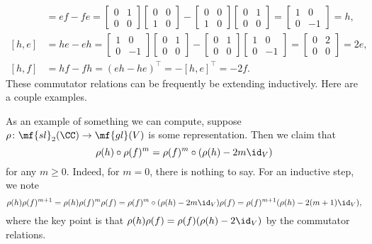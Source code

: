 \documentclass[../notes.tex]{subfiles}
\begin{document}
\begin{align*}
	[e,f] &= ef-fe = \begin{bmatrix}
		0 & 1 \\
		0 & 0
	\end{bmatrix}\begin{bmatrix}
		0 & 0 \\
		1 & 0
	\end{bmatrix}-\begin{bmatrix}
		0 & 0 \\
		1 & 0
	\end{bmatrix}\begin{bmatrix}
		0 & 1 \\
		0 & 0
	\end{bmatrix}=\begin{bmatrix}
		1 & 0 \\ 0 & -1
	\end{bmatrix}=h, \\
	[h,e] &= he-eh = \begin{bmatrix}
		1 & 0 \\
		0 & -1
	\end{bmatrix}\begin{bmatrix}
		0 & 1 \\
		0 & 0
	\end{bmatrix}-\begin{bmatrix}
		0 & 1 \\
		0 & 0
	\end{bmatrix}\begin{bmatrix}
		1 & 0 \\
		0 & -1
	\end{bmatrix} = \begin{bmatrix}
		0 & 2 \\
		0 & 0
	\end{bmatrix} = 2e, \\
	[h,f] &= hf-fh = (eh-he)^\intercal = -[h,e]^\intercal = -2f.
\end{align*}
These commutator relations can be frequently be extending inductively. Here are a couple examples.
\begin{example} \label{ex:sl2-hf-power}
	As an example of something we can compute, suppose $\rho\colon\mf{sl}_2(\CC)\to\mf{gl}(V)$ is some representation. Then we claim that
	\[\rho(h)\circ\rho(f)^m=\rho(f)^m\circ(\rho(h)-2m{\id_V})\]
	for any $m\ge0$. Indeed, for $m=0$, there is nothing to say. For an inductive step, we note
	\[\rho(h)\rho(f)^{m+1}=\rho(h)\rho(f)^m\rho(f)=\rho(f)^m\circ(\rho(h)-2m{\id_V})\rho(f)=\rho(f)^{m+1}(\rho(h)-2(m+1){\id_V}),\]
	where the key point is that $\rho(h)\rho(f)=\rho(f)(\rho(h)-2{\id_V})$ by the commutator relations.
\end{example}
\end{document}
